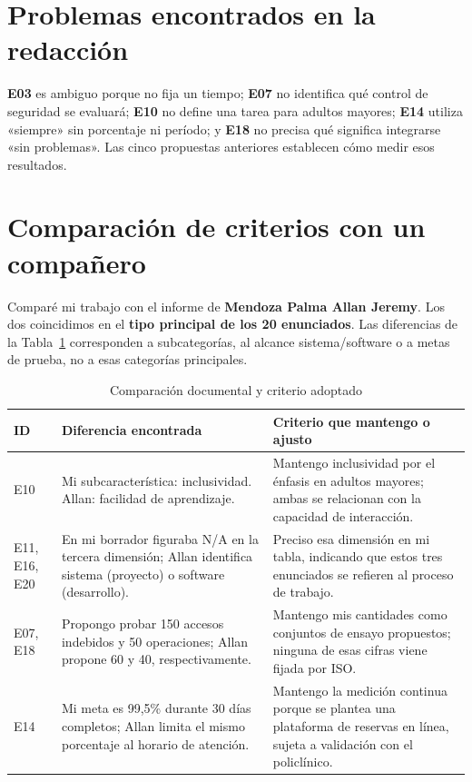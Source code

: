 \documentclass[10pt,a4paper,onecolumn]{IEEEtran}
\begin{document}
\par

\section{Problemas encontrados en la redacción}
\textbf{E03} es ambiguo porque no fija un tiempo; \textbf{E07} no identifica qué control de seguridad se evaluará; \textbf{E10} no define una tarea para adultos mayores; \textbf{E14} utiliza «siempre» sin porcentaje ni período; y \textbf{E18} no precisa qué significa integrarse «sin problemas». Las cinco propuestas anteriores establecen cómo medir esos resultados.

\section{Comparación de criterios con un compañero}
Comparé mi trabajo con el informe de \textbf{Mendoza Palma Allan Jeremy}. Los dos coincidimos en el \textbf{tipo principal de los 20 enunciados}. Las diferencias de la Tabla~\ref{tab:comparacion} corresponden a subcategorías, al alcance sistema/software o a metas de prueba, no a esas categorías principales.

\begin{table}[htbp]
\centering\footnotesize
\caption{Comparación documental y criterio adoptado}
\label{tab:comparacion}
\begin{tabularx}{\linewidth}{@{}p{1.25cm}p{5.5cm}X@{}}
\toprule
\textbf{ID}&\textbf{Diferencia encontrada}&\textbf{Criterio que mantengo o ajusto}\\
\midrule
E10 & Mi subcaracterística: inclusividad. Allan: facilidad de aprendizaje. & Mantengo inclusividad por el énfasis en adultos mayores; ambas se relacionan con la capacidad de interacción.\\
\addlinespace
E11, E16, E20 & En mi borrador figuraba N/A en la tercera dimensión; Allan identifica sistema (proyecto) o software (desarrollo). & Preciso esa dimensión en mi tabla, indicando que estos tres enunciados se refieren al proceso de trabajo.\\
\addlinespace
E07, E18 & Propongo probar 150 accesos indebidos y 50 operaciones; Allan propone 60 y 40, respectivamente. & Mantengo mis cantidades como conjuntos de ensayo propuestos; ninguna de esas cifras viene fijada por ISO.\\
\addlinespace
E14 & Mi meta es 99,5\% durante 30 días completos; Allan limita el mismo porcentaje al horario de atención. & Mantengo la medición continua porque se plantea una plataforma de reservas en línea, sujeta a validación con el policlínico.\\
\bottomrule
\end{tabularx}
\end{table}
\end{document}
